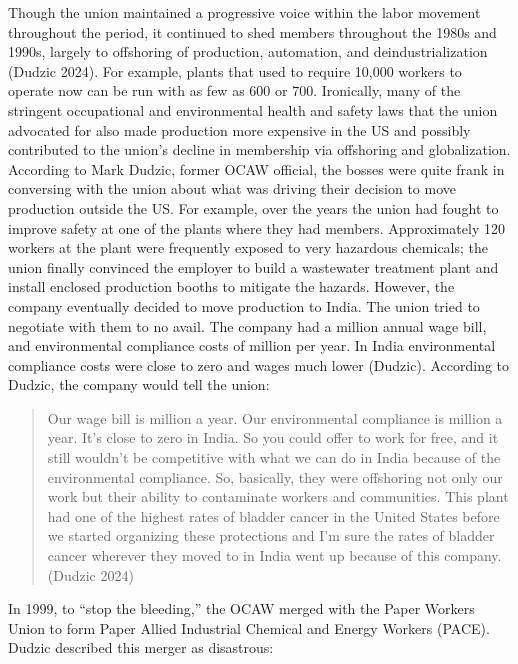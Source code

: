 Though the union maintained a progressive voice within the labor movement throughout the period, it continued to shed members throughout the 1980s and 1990s, largely to offshoring of production, automation, and deindustrialization (Dudzic 2024). For example, plants that used to require 10,000 workers to operate now can be run with as few as 600 or 700. Ironically, many of the stringent occupational and environmental health and safety laws that the union advocated for also made production more expensive in the US and possibly contributed to the union’s decline in membership via offshoring and globalization. According to Mark Dudzic, former OCAW official, the bosses were quite frank in conversing with the union about what was driving their decision to move production outside the US. For example, over the years the union had fought to improve safety at one of the plants where they had members. Approximately 120 workers at the plant were frequently exposed to very hazardous chemicals; the union finally convinced the employer to build a wastewater treatment plant and install enclosed production booths to mitigate the hazards. However, the company eventually decided to move production to India. The union tried to negotiate with them to no avail. The company had a   million annual wage bill, and environmental compliance costs of   million per year. In India environmental compliance costs were close to zero and wages much lower (Dudzic). According to Dudzic, the company would tell the union:

\begin{quote}
Our wage bill is  million a year. Our environmental compliance is  million a year. It's close to zero in India. So you could offer to work for free, and it still wouldn't be competitive with what we can do in India because of the environmental compliance. So, basically, they were offshoring not only our work but their ability to contaminate workers and communities. This plant had one of the highest rates of bladder cancer in the United States before we started organizing these protections and I'm sure the rates of bladder cancer wherever they moved to in India went up because of this company. (Dudzic 2024)
\end{quote}

In 1999, to “stop the bleeding,” the OCAW merged with the Paper Workers Union to form Paper Allied Industrial Chemical and Energy Workers (PACE). Dudzic described this merger as disastrous:

